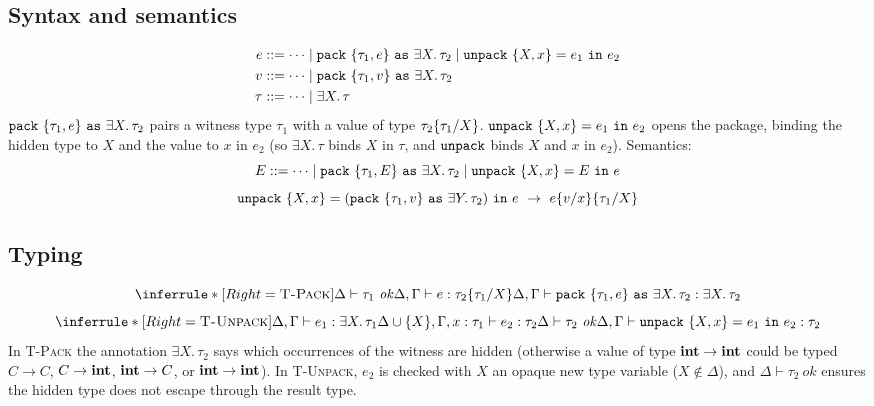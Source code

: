 \subsection{Syntax and semantics}
\begin{align*}
e &::= \cdots \mid \mathtt{pack}\ \{\tau_1, e\}\ \mathtt{as}\ \exists X.\, \tau_2
      \mid \mathtt{unpack}\ \{X, x\} = e_1\ \mathtt{in}\ e_2 \\
v &::= \cdots \mid \mathtt{pack}\ \{\tau_1, v\}\ \mathtt{as}\ \exists X.\, \tau_2 \\
\tau &::= \cdots \mid \exists X.\, \tau
\end{align*}
$\mathtt{pack}\ \{\tau_1, e\}\ \mathtt{as}\ \exists X.\, \tau_2$ pairs a witness type
$\tau_1$ with a value of type $\tau_2\{\tau_1/X\}$.
$\ttkw{unpack}\ \{X, x\} = e_1\ \ttkw{in}\ e_2$ opens the package, binding the hidden
type to $X$ and the value to $x$ in $e_2$ (so $\exists X.\, \tau$ binds $X$ in
$\tau$, and $\mathtt{unpack}$ binds $X$ and $x$ in $e_2$). Semantics:
\[
E ::= \cdots \mid \ttkw{pack}\ \{\tau_1, E\}\ \ttkw{as}\ \exists X.\, \tau_2
  \mid \ttkw{unpack}\ \{X, x\} = E\ \ttkw{in}\ e
\]
\[
\mathtt{unpack}\ \{X, x\} = (\mathtt{pack}\ \{\tau_1, v\}\ \mathtt{as}\ \exists Y.\, \tau_2)\ \mathtt{in}\ e
  \ \to\ e\{v/x\}\{\tau_1/X\}
\]

\subsection{Typing}
\[
\inferrule*[Right=\textsc{T-Pack}]
  {\Delta \vdash \tau_1\ \mathit{ok} \\ \Delta, \Gamma \vdash e : \tsub{\tau_2}{\tau_1}{X}}
  {\Delta, \Gamma \vdash \ttkw{pack}\ \{\tau_1, e\}\ \ttkw{as}\ \exists X.\, \tau_2 : \exists X.\, \tau_2}
\]
\[
\inferrule*[Right=\textsc{T-Unpack}]
  {\Delta, \Gamma \vdash e_1 : \exists X.\, \tau_1 \\
   \Delta \cup \{X\}, \Gamma, x : \tau_1 \vdash e_2 : \tau_2 \\
   \Delta \vdash \tau_2\ \mathit{ok}}
  {\Delta, \Gamma \vdash \ttkw{unpack}\ \{X, x\} = e_1\ \ttkw{in}\ e_2 : \tau_2}
\]
In \textsc{T-Pack} the annotation $\exists X.\, \tau_2$ says which occurrences of
the witness are hidden (otherwise a value of type $\mathbf{int} \to \mathbf{int}$ could be
typed $C \to C$, $C \to \mathbf{int}$, $\mathbf{int} \to C$, or $\mathbf{int} \to \mathbf{int}$). In
\textsc{T-Unpack}, $e_2$ is checked with $X$ an opaque new type variable ($X \notin
\Delta$), and $\Delta \vdash \tau_2\ \mathit{ok}$ ensures the hidden type does not
escape through the result type.

